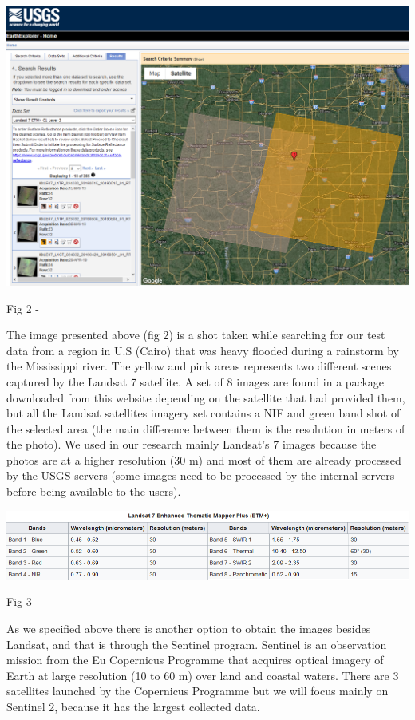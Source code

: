 \documentclass[12pt, a4paper]{report}
\begin{document}
\bigskip

\includegraphics[scale=0.5, right]{landsat_search.png} 
\begin{center}
Fig 2 - \cite{20}
\end{center}

The image presented above (fig 2) is a shot taken while searching for our test data from a region in U.S (Cairo) that was heavy flooded during a rainstorm by the Mississippi river. The yellow and pink areas represents two different scenes captured by the Landsat 7 satellite. A set of 8 images are found in a package downloaded from this website depending on the satellite that had provided them, but all the Landsat satellites imagery set contains a NIF and green band shot of the selected area (the main difference between them is the resolution in meters of the photo). We used in our research mainly Landsat's 7 images because the photos are at a higher resolution (30 m) and most of them are already processed by the USGS servers (some images need to be processed by the internal servers before being available to the users).

\includegraphics[scale=0.73, center]{Capture.png} 
\begin{center}
Fig 3 - \cite{21}
\end{center}


\medskip

As we specified above there is another option to obtain the images besides Landsat, and that is through the Sentinel program. Sentinel is an observation mission from the Eu Copernicus Programme that acquires optical imagery of Earth at large resolution (10 to 60 m) over land and coastal waters. There are 3 satellites launched by the Copernicus Programme but we will focus mainly on Sentinel 2, because it has the largest collected data. 
\par 
\end{document}

